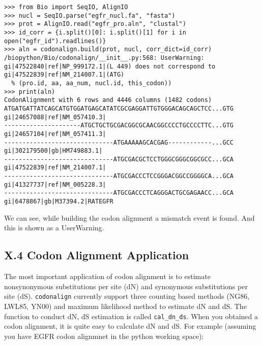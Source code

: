 \documentclass{article}
\begin{document}
\begin{verbatim}
>>> from Bio import SeqIO, AlignIO
>>> nucl = SeqIO.parse("egfr_nucl.fa", "fasta")
>>> prot = AlignIO.read("egfr_pro.aln", "clustal")
>>> id_corr = {i.split()[0]: i.split()[1] for i in open("egfr_id").readlines()}
>>> aln = codonalign.build(prot, nucl, corr_dict=id_corr)
/biopython/Bio/codonalign/__init__.py:568: UserWarning: gi|47522840|ref|NP_999172.1|(L 449) does not correspond to gi|47522839|ref|NM_214007.1|(ATG)
  % (pro.id, aa, aa_num, nucl.id, this_codon))
>>> print(aln)
CodonAlignment with 6 rows and 4446 columns (1482 codons)
ATGATGATTATCAGCATGTGGATGAGCATATCGCGAGGATTGTGGGACAGCAGCTCC...GTG gi|24657088|ref|NM_057410.3|
---------------------ATGCTGCTGCGACGGCGCAACGGCCCCTGCCCCTTC...GTG gi|24657104|ref|NM_057411.3|
------------------------------ATGAAAAAGCACGAG------------...GCC gi|302179500|gb|HM749883.1|
------------------------------ATGCGACGCTCCTGGGCGGGCGGCGCC...GCA gi|47522839|ref|NM_214007.1|
------------------------------ATGCGACCCTCCGGGACGGCCGGGGCA...GCA gi|41327737|ref|NM_005228.3|
------------------------------ATGCGACCCTCAGGGACTGCGAGAACC...GCA gi|6478867|gb|M37394.2|RATEGFR
\end{verbatim}

We can see, while building the codon alignment a mismatch event is
found. And this is shown as a UserWarning.

\subsection{X.4 Codon Alignment Application}

The most important application of codon alignment is to estimate
nonsynonymous substitutions per site (dN) and synonymous substitutions
per site (dS). \texttt{codonalign} currently support three counting
based methods (NG86, LWL85, YN00) and maximum likelihood method to
estimate dN and dS. The function to conduct dN, dS estimation is called
\texttt{cal\_dn\_ds}. When you obtained a codon alignment, it is quite
easy to calculate dN and dS. For example (assuming you have EGFR codon
alignmnet in the python working space):
\end{document}
